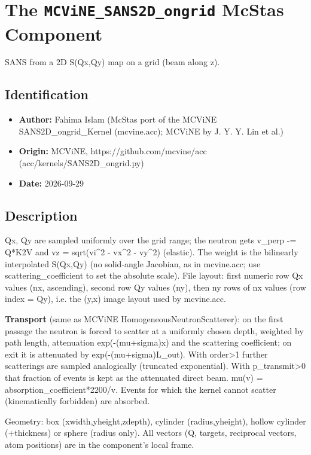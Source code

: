 \section{The \texttt{MCViNE\_SANS2D\_ongrid} McStas Component}
SANS from a 2D S(Qx,Qy) map on a grid (beam along z).

\subsection*{Identification}
\begin{itemize}
  \item \textbf{Author:} Fahima Islam (McStas port of the MCViNE SANS2D\_ongrid\_Kernel (mcvine.acc); MCViNE by J. Y. Y. Lin et al.)
  \item \textbf{Origin:} MCViNE, https://github.com/mcvine/acc (acc/kernels/SANS2D\_ongrid.py)
  \item \textbf{Date:} 2026-09-29
\end{itemize}

\subsection*{Description}
Qx, Qy are sampled uniformly over the grid range; the neutron gets v\_perp -= Q*K2V and vz = sqrt(vi\textasciicircum{}2 - vx\textasciicircum{}2 - vy\textasciicircum{}2) (elastic). The weight is the bilinearly interpolated S(Qx,Qy) (no solid-angle Jacobian, as in mcvine.acc; use scattering\_coefficient to set the absolute scale). File layout: first numeric row Qx values (nx, ascending), second row Qy values (ny), then ny rows of nx values (row index = Qy), i.e. the (y,x) image layout used by mcvine.acc.

\textbf{Transport} (same as MCViNE HomogeneousNeutronScatterer): on the first passage the neutron is forced to scatter at a uniformly chosen depth, weighted by path length, attenuation exp(-(mu+sigma)x) and the scattering coefficient; on exit it is attenuated by exp(-(mu+sigma)L\_out). With order\textgreater{}1 further scatterings are sampled analogically (truncated exponential). With p\_transmit\textgreater{}0 that fraction of events is kept as the attenuated direct beam. mu(v) = absorption\_coefficient*2200/v. Events for which the kernel cannot scatter (kinematically forbidden) are absorbed.

Geometry: box (xwidth,yheight,zdepth), cylinder (radius,yheight), hollow cylinder (+thickness) or sphere (radius only). All vectors (Q, targets, reciprocal vectors, atom positions) are in the component's local frame.

